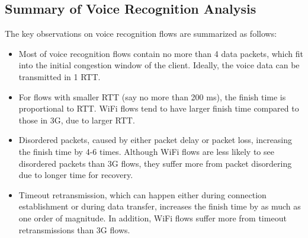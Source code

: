\subsection{Summary of Voice Recognition Analysis}

The key observations on voice recognition flows are summarized as follows:
\begin{itemize}
\item Most of voice recognition flows contain no more than 4 data packets, which fit into the initial congestion window of the client. Ideally, the voice data can be transmitted in 1 RTT.
\item For flows with smaller RTT (say no more than 200 ms), the finish time is proportional to RTT. WiFi flows tend to have larger finish time compared to those in 3G, due to larger RTT. 	
\item Disordered packets, caused by either packet delay or packet loss, increasing the finish time by 4-6 times. Although WiFi flows are less likely to see disordered packets than 3G flows, they suffer more from packet disordering due to longer time for recovery.
\item Timeout retransmission, which can happen either during connection establishment or during data transfer, increases the finish time by as much as one order of magnitude. In addition, WiFi flows suffer more from timeout retransmissions than 3G flows.
\end{itemize}